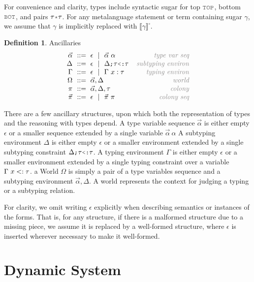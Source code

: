 \documentclass[acmsmall]{acmart}
\theoremstyle{definition}
\newtheorem{definition}{Definition}[section]
\begin{document}
For convenience and clarity, types include syntactic sugar for top $\J{TOP}$, 
bottom $\J{BOT}$, and pairs $\tau \J{*} \tau$.
For any metalanguage statement or term containing sugar $\gamma$, we assume that $\gamma$ is implicitly replaced with $\llbracket \gamma \rrbracket^\square$.


\begin{definition} Ancillaries 
  \label{def:type_ancillaries}
  \[\begin{array}[t]{r@{}l@{}r}
    \nonterm{\vec{\alpha}} & \is \epsilon \sep \vec{\alpha}\ \alpha 
    & \com{type var seq}
    \\
    \nonterm{\Delta} & \is \epsilon \sep \Delta \J{;} \tau \J{<:} \tau
    & \com{subtyping environ}
    \\
    \nonterm{\Gamma} & \is \epsilon \sep \Gamma\ x \hastype \tau
    & \com{typing environ}
    \\
    \nonterm{\Omega} & \is \vec{\alpha},\Delta 
    & \com{world}
    \\
    \nonterm{\pi} & \is \vec{\alpha},\Delta,\tau
    & \com{colony}
    \\
    \nonterm{\vec{\pi}} & \is \epsilon \sep \vec{\pi}\ \pi 
    & \com{colony seq}
  \end{array}\]
\end{definition}


There are a few ancillary structures, upon which both the representation of types and the reasoning with types depend.
A type variable sequence $\vec{\alpha}$ is either empty $\epsilon$ or a smaller sequence extended by a single variable $\vec{\alpha}\ \alpha$
A subtyping environment $\Delta$ is either empty $\epsilon$ or a smaller environment extended by a single
subtyping constraint $\Delta \J{;} \tau \J{<:} \tau$.
A typing environment $\Gamma$ is either empty $\epsilon$ or a smaller environment extended by a single
typing constraint over a variable $\Gamma\ x <: \tau$.
a World $\Omega$ is simply a pair of a type variables sequence and a subtyping environment $\vec{\alpha}, \Delta$.
A world represents the context for judging a typing or a subtyping relation.


For clarity, we omit writing $\epsilon$ explicitly when describing semantics or instances of the forms.
That is, for any structure, if there is a malformed structure due to a missing piece, 
we assume it is replaced by a well-formed structure, 
where $\epsilon$ is inserted wherever necessary to make it well-formed.

\section{Dynamic System}
\label{sec:dynamic_system}
\end{document}
